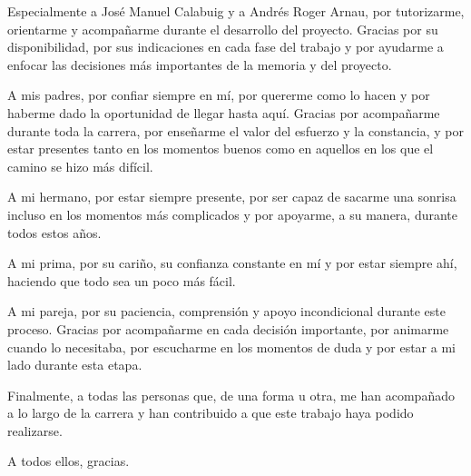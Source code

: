 \documentclass[11pt,spanish,listoffigures,listoftables]{tfgetsinf}
\begin{document}
Especialmente a José Manuel Calabuig y a Andrés Roger Arnau, por tutorizarme, orientarme y acompañarme durante el desarrollo del proyecto. Gracias por su disponibilidad, por sus indicaciones en cada fase del trabajo y por ayudarme a enfocar las decisiones más importantes de la memoria y del proyecto.

A mis padres, por confiar siempre en mí, por quererme como lo hacen y por haberme dado la oportunidad de llegar hasta aquí. Gracias por acompañarme durante toda la carrera, por enseñarme el valor del esfuerzo y la constancia, y por estar presentes tanto en los momentos buenos como en aquellos en los que el camino se hizo más difícil.

A mi hermano, por estar siempre presente, por ser capaz de sacarme una sonrisa incluso en los momentos más complicados y por apoyarme, a su manera, durante todos estos años.

A mi prima, por su cariño, su confianza constante en mí y por estar siempre ahí, haciendo que todo sea un poco más fácil.

A mi pareja, por su paciencia, comprensión y apoyo incondicional durante este proceso. Gracias por acompañarme en cada decisión importante, por animarme cuando lo necesitaba, por escucharme en los momentos de duda y por estar a mi lado durante esta etapa.

Finalmente, a todas las personas que, de una forma u otra, me han acompañado a lo largo de la carrera y han contribuido a que este trabajo haya podido realizarse.

A todos ellos, gracias.

\cleardoublepage


\tableofcontents
\listoffigures
\listoftables

\cleardoublepage


\mainmatter

\end{document}
